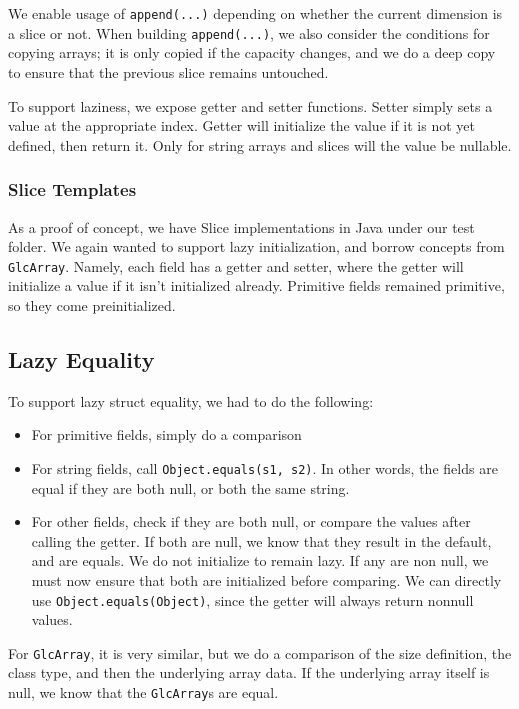 \documentclass[11pt]{article}
\begin{document}
We enable usage of \texttt{append(...)} depending on whether the
current dimension is a slice or not.  When building
\texttt{append(...)}, we also consider the conditions for copying
arrays; it is only copied if the capacity changes, and we do a deep
copy to ensure that the previous slice remains untouched.

To support laziness, we expose getter and setter functions.  Setter
simply sets a value at the appropriate index.  Getter will initialize
the value if it is not yet defined, then return it.  Only for string
arrays and slices will the value be nullable.

\subsubsection{Slice Templates}
\label{sec:slice-template}

As a proof of concept, we have Slice implementations in Java under our
test folder.  We again wanted to support lazy initialization, and
borrow concepts from \texttt{GlcArray}.  Namely, each field has a
getter and setter, where the getter will initialize a value if it
isn't initialized already.  Primitive fields remained primitive, so
they come preinitialized.

\subsection{Lazy Equality}
\label{sec:lazy-eq}

To support lazy struct equality, we had to do the following:

\begin{itemize}
\item For primitive fields, simply do a comparison
\item For string fields, call \texttt{Object.equals(s1, s2)}. In other
  words, the fields are equal if they are both null, or both the same
  string.
\item For other fields, check if they are both null, or compare the
  values after calling the getter. If both are null, we know that they
  result in the default, and are equals. We do not initialize to
  remain lazy. If any are non null, we must now ensure that both are
  initialized before comparing. We can directly use
  \texttt{Object.equals(Object)}, since the getter will always return
  nonnull values.
\end{itemize}

For \texttt{GlcArray}, it is very similar, but we do a comparison of
the size definition, the class type, and then the underlying array
data.  If the underlying array itself is null, we know that the
\texttt{GlcArray}s are equal.
\end{document}
